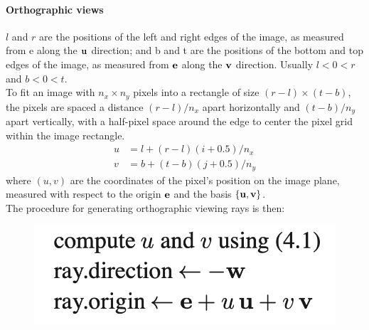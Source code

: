 \documentclass[11pt]{article}
\numberwithin{equation}{section}
\begin{document}
\paragraph{Orthographic views}
$l$ and $r$ are the positions of the left and right edges of the image, as measured from e along the $\textbf{u}$ direction; and b and t are the positions of the bottom and top edges of the image, as measured from $\textbf{e}$ along the $\textbf{v}$ direction. Usually $l < 0 < r$ and $b < 0 < t$. \\
To fit an image with $n_x \times n_y$ pixels into a rectangle of size $(r-l) \times (t-b)$, the pixels are spaced a distance $(r - l)/n_x$ apart horizontally and $(t-b)/n_y$ apart vertically, with a half-pixel space around the edge to center the pixel grid within the image rectangle.
\begin{align}
	u &= l + (r - l)(i+0.5)/n_x \\
	v &= b + (t - b)(j+0.5)/n_y
\end{align}
where $(u, v)$ are the coordinates of the pixel's position on the image plane, measured with respect to the origin $\textbf{e}$ and the basis $\{\textbf{u}, \textbf{v}\}$.\\
The procedure for generating orthographic viewing rays is then:
	\begin{figure}[H]
	\centering
	\includegraphics[scale=0.4]{p27}
	\end{figure}
\end{document}
